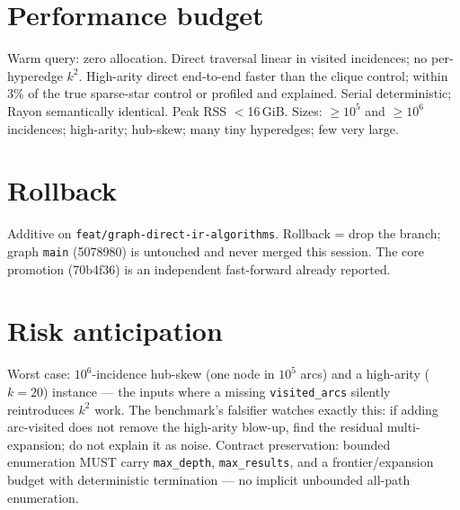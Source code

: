 \documentclass[11pt]{article}
\begin{document}
\section{Performance budget}
Warm query: zero allocation. Direct traversal linear in visited incidences; no per-hyperedge $k^2$.
High-arity direct end-to-end faster than the clique control; within 3\% of the true sparse-star control
or profiled and explained. Serial deterministic; Rayon semantically identical. Peak RSS $<$16\,GiB.
Sizes: $\geq 10^5$ and $\geq 10^6$ incidences; high-arity; hub-skew; many tiny hyperedges; few very large.

\section{Rollback}
Additive on \texttt{feat/graph-direct-ir-algorithms}. Rollback = drop the branch; graph \texttt{main}
(5078980) is untouched and never merged this session. The core promotion (70b4f36) is an independent
fast-forward already reported.

\section{Risk anticipation}
Worst case: $10^6$-incidence hub-skew (one node in $10^5$ arcs) and a high-arity ($k=20$) instance ---
the inputs where a missing \texttt{visited\_arcs} silently reintroduces $k^2$ work. The benchmark's
falsifier watches exactly this: if adding arc-visited does not remove the high-arity blow-up, find the
residual multi-expansion; do not explain it as noise. Contract preservation: bounded enumeration MUST
carry \texttt{max\_depth}, \texttt{max\_results}, and a frontier/expansion budget with deterministic
termination --- no implicit unbounded all-path enumeration.
\end{document}
